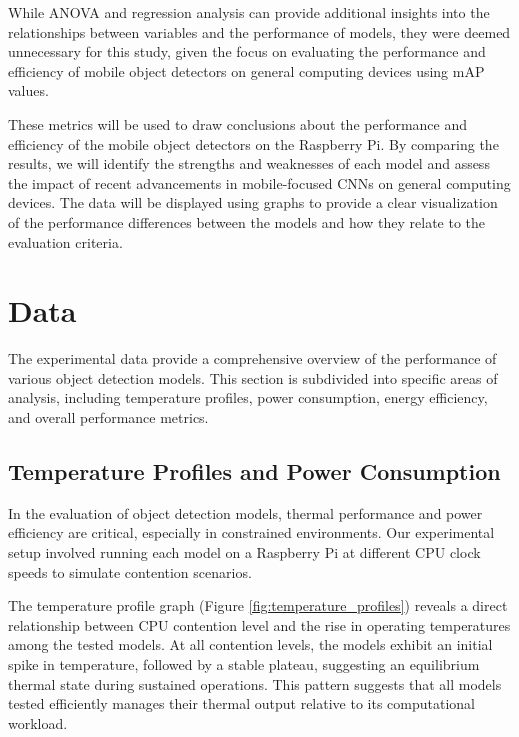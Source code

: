 \documentclass[10pt,twocolumn,letterpaper]{article}
\begin{document}
While ANOVA and regression analysis can provide additional insights into the relationships between variables and the performance of models, they were deemed unnecessary for this study, given the focus on evaluating the performance and efficiency of mobile object detectors on general computing devices using mAP values.

These metrics will be used to draw conclusions about the performance and efficiency of the mobile object detectors on the Raspberry Pi.
By comparing the results, we will identify the strengths and weaknesses of each model and assess the impact of recent advancements in mobile-focused CNNs on general computing devices.
The data will be displayed using graphs to provide a clear visualization of the performance differences between the models and how they relate to the evaluation criteria.

\section{Data}
\label{sec:data}
The experimental data provide a comprehensive overview of the performance of various object detection models. This section is subdivided into specific areas of analysis, including temperature profiles, power consumption, energy efficiency, and overall performance metrics.

\subsection{Temperature Profiles and Power Consumption}
\label{subsec:temperature_power}

In the evaluation of object detection models, thermal performance and power efficiency are critical, especially in constrained environments. Our experimental setup involved running each model on a Raspberry Pi at different CPU clock speeds to simulate contention scenarios.

The temperature profile graph (Figure \ref{fig:temperature_profiles}) reveals a direct relationship between CPU contention level and the rise in operating temperatures among the tested models. At all contention levels, the models exhibit an initial spike in temperature, followed by a stable plateau, suggesting an equilibrium thermal state during sustained operations. This pattern suggests that all models tested efficiently manages their thermal output relative to its computational workload.
\end{document}
